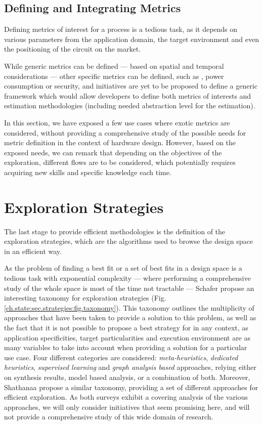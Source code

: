 \clearpage
    \subsection{Defining and Integrating Metrics}
        Defining metrics of interest for a  process is a tedious task, as it depends on various parameters from the application domain, the target environment and even the positioning of the circuit on the market.

        While generic metrics can be defined --- based on spatial and temporal considerations --- other specific metrics can be defined, such as , power consumption or security, and initiatives are yet to be proposed to define a generic  framework which would allow developers to define both metrics of interests and estimation methodologies (including needed abstraction level for the estimation).

        In this section, we have exposed a few use cases where exotic metrics are considered, without providing a comprehensive study of the possible needs for metric definition in the context of hardware design.
        However, based on the exposed needs, we can remark that depending on the objectives of the exploration, different flows are to be considered, which potentially requires acquiring new skills and specific knowledge each time.

\section{Exploration Strategies}
\label{ch.state:sec.strategies}
    The last stage to provide efficient  methodologies is the definition of the exploration strategies, which are the algorithms used to browse the design space in an efficient way.

    As the problem of finding a best fit or a set of best fits in a design space is a tedious task with exponential complexity --- where performing a comprehensive study of the whole space is most of the time not tractable --- Schafer \etal{} \cite{schafer_high-level_2020} propose an interesting taxonomy for exploration strategies (Fig. \ref{ch.state:sec.strategies:fig.taxonomy}).
    This taxonomy outlines the multiplicity of approaches that have been taken to provide a solution to this problem, as well as the fact that it is not possible to propose a best strategy for  in any context, as application specificities, target particularities and execution environment are as many variables to take into account when providing a solution for a particular use case.
    Four different categories are considered: {\it meta-heuristics}, {\it dedicated heuristics}, {\it supervised learning} and {\it graph analysis based} approaches, relying either on synthesis results, model based analysis, or a combination of both.
    Moreover, Shathanaa \etal{} \cite{sa_design_2018} propose a similar taxonomy, providing a set of different approaches for efficient exploration.
    As both surveys exhibit a covering analysis of the various approaches, we will only consider initiatives that seem promising here, and will not provide a comprehensive study of this wide domain of research.

